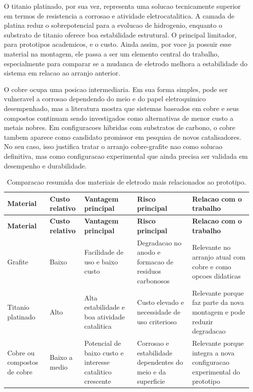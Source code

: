\documentclass[12pt,oneside,a4paper,english,brazilian]{abntex2}
\begin{document}
O titanio platinado, por sua vez, representa uma solucao tecnicamente superior em termos de resistencia a corrosao e atividade eletrocatalitica. A camada de platina reduz o sobrepotencial para a evolucao de hidrogenio, enquanto o substrato de titanio oferece boa estabilidade estrutural. O principal limitador, para prototipos academicos, e o custo. Ainda assim, por voce ja possuir esse material na montagem, ele passa a ser um elemento central do trabalho, especialmente para comparar se a mudanca de eletrodo melhora a estabilidade do sistema em relacao ao arranjo anterior.

O cobre ocupa uma posicao intermediaria. Em sua forma simples, pode ser vulneravel a corrosao dependendo do meio e do papel eletroquimico desempenhado, mas a literatura mostra que sistemas baseados em cobre e seus compostos continuam sendo investigados como alternativas de menor custo a metais nobres. Em configuracoes hibridas com substratos de carbono, o cobre tambem aparece como candidato promissor em pesquisa de novos catalisadores. No seu caso, isso justifica tratar o arranjo cobre-grafite nao como solucao definitiva, mas como configuracao experimental que ainda precisa ser validada em desempenho e durabilidade.

\small
\setlength{\tabcolsep}{3pt}
\begin{longtable}{@{}>{\RaggedRight\arraybackslash}p{}>{\RaggedRight\arraybackslash}p{}>{\RaggedRight\arraybackslash}p{}>{\RaggedRight\arraybackslash}p{}>{\RaggedRight\arraybackslash}p{}@{}}
\caption{Comparacao resumida dos materiais de eletrodo mais relacionados ao prototipo.}\label{tab:eletrodos-prototipo}\\
\toprule
\textbf{Material} & \textbf{Custo relativo} & \textbf{Vantagem principal} & \textbf{Risco principal} & \textbf{Relacao com o trabalho} \\
\midrule
\endfirsthead

\toprule
\textbf{Material} & \textbf{Custo relativo} & \textbf{Vantagem principal} & \textbf{Risco principal} & \textbf{Relacao com o trabalho} \\
\midrule
\endhead

\midrule
\endfoot

\bottomrule
\endlastfoot

Grafite & Baixo & Facilidade de uso e baixo custo & Degradacao no anodo e formacao de residuos carbonosos & Relevante no arranjo atual com cobre e como opcoes didaticas \\
\midrule
Titanio platinado & Alto & Alta estabilidade e boa atividade catalitica & Custo elevado e necessidade de uso criterioso & Relevante porque faz parte da nova montagem e pode reduzir degradacao \\
\midrule
Cobre ou compostos de cobre & Baixo a medio & Potencial de baixo custo e interesse catalitico crescente & Corrosao e estabilidade dependentes do meio e da superficie & Relevante porque integra a nova configuracao experimental do prototipo \\
\end{longtable}
\normalsize
\end{document}
